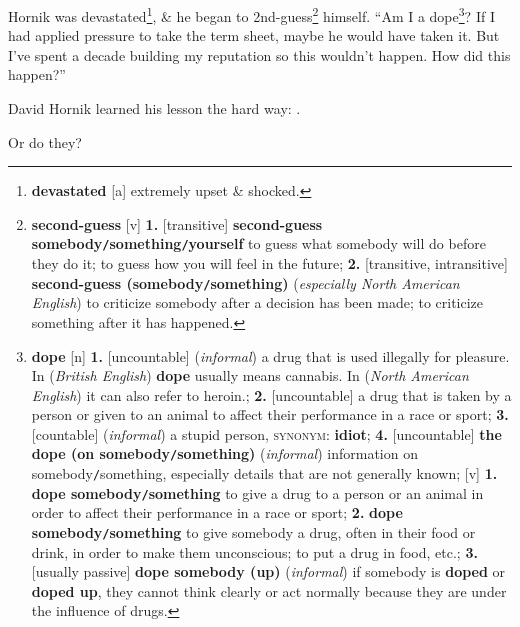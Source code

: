 \documentclass[oneside]{book}
\numberwithin{equation}{section}
\begin{document}
Hornik was devastated\footnote{\textbf{devastated} [a] extremely upset \& shocked.}, \& he began to 2nd-guess\footnote{\textbf{second-guess} [v] \textbf{1.} [transitive] \textbf{second-guess somebody\texttt{/}something\texttt{/}yourself} to guess what somebody will do before they do it; to guess how you will feel in the future; \textbf{2.} [transitive, intransitive] \textbf{second-guess (somebody\texttt{/}something)} (\textit{especially North American English}) to criticize somebody after a decision has been made; to criticize something after it has happened.} himself. ``Am I a dope\footnote{\textbf{dope} [n] \textbf{1.} [uncountable] (\textit{informal}) a drug that is used illegally for pleasure. In (\textit{British English}) \textbf{dope} usually means cannabis. In (\textit{North American English}) it can also refer to heroin.; \textbf{2.} [uncountable] a drug that is taken by a person or given to an animal to affect their performance in a race or sport; \textbf{3.} [countable] (\textit{informal}) a stupid person, \textsc{synonym}: \textbf{idiot}; \textbf{4.} [uncountable] \textbf{the dope (on somebody\texttt{/}something)} (\textit{informal}) information on somebody\texttt{/}something, especially details that are not generally known; [v] \textbf{1.} \textbf{dope somebody\texttt{/}something} to give a drug to a person or an animal in order to affect their performance in a race or sport; \textbf{2.} \textbf{dope somebody\texttt{/}something} to give somebody a drug, often in their food or drink, in order to make them unconscious; to put a drug in food, etc.; \textbf{3.} [usually passive] \textbf{dope somebody (up)} (\textit{informal}) if somebody is \textbf{doped} or \textbf{doped up}, they cannot think clearly or act normally because they are under the influence of drugs.}? If I had applied pressure to take the term sheet, maybe he would have taken it. But I've spent a decade building my reputation so this wouldn't happen. How did this happen?''

David Hornik learned his lesson the hard way: .

Or do they?
\end{document}
